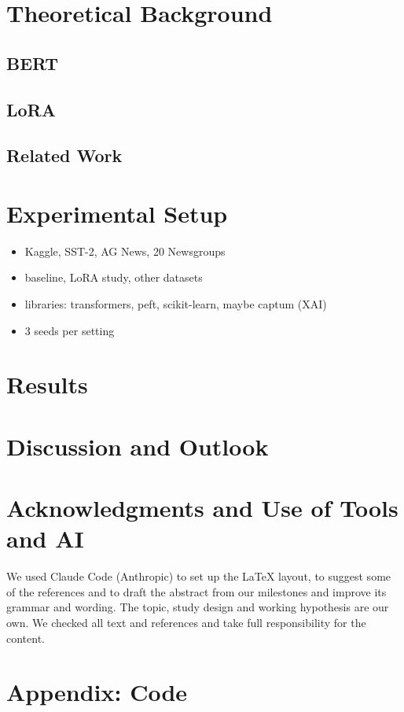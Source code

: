 \documentclass[conference]{IEEEtran}  %
\theoremstyle{plain}
\theoremstyle{definition}
\theoremstyle{remark}
\begin{document}
\section{Theoretical Background}
\label{sec:background}
\subsection{BERT}
\subsection{LoRA}
\subsection{Related Work}

\section{Experimental Setup}
\label{sec:setup}
\begin{itemize}
  \item Kaggle, SST-2, AG News, 20 Newsgroups
  \item baseline, LoRA study, other datasets
  \item libraries: transformers, peft, scikit-learn, maybe captum (XAI)
  \item 3 seeds per setting
\end{itemize}

\section{Results}
\label{sec:results}

\section{Discussion and Outlook}
\label{sec:discussion}

\section*{Acknowledgments and Use of Tools and AI}
We used Claude Code (Anthropic) to set up the LaTeX layout, to suggest some of the references and to draft the abstract from our milestones and improve its grammar and wording.
The topic, study design and working hypothesis are our own.
We checked all text and references and take full responsibility for the content.

\nocite{devlin2019bert,hu2022lora,sun2019finetune,dodge2020finetuning,socher2013sst,wang2019glue,zhang2015charcnn,lang1995newsweeder}

\clearpage



\section*{Appendix: Code}
\end{document}
